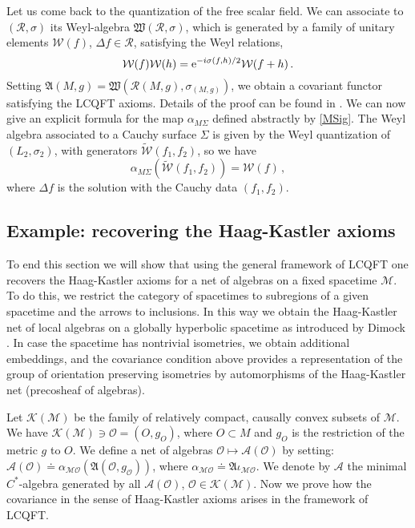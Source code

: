 \documentclass[12pt]{article}
\newcommand{\fA}{\mathfrak{A}}
\newcommand{\Kcal}{\mathcal{K}}
\newcommand{\Mcal}{\mathcal{M}}
\newcommand{\Ocal}{\mathcal{O}}
\newcommand{\Acal}{\mathcal{A}}
\newcommand{\Rcal}{\mathcal{R}}
\newcommand{\Wcal}{\mathcal{W}}
\newcommand{\al}{\alpha}
\newcommand{\De}{\Delta}
\newcommand{\1}{\mathds{1}}                         %
\newcommand{\be}{\begin{equation}}
\newcommand{\ee}{\end{equation}}
\begin{document}
{Let us come back to the quantization of the free scalar field. We can associate to $(\Rcal,\sigma)$ its Weyl-algebra $\mathfrak{W}({\mathcal R},\sigma)$, which is generated
by a family of unitary elements $\Wcal(f)$, $\De f \in {\mathcal R}$,
satisfying the Weyl relations,
\be\label{Weyl}
\Wcal(f)\Wcal(h) = {\rm
  e}^{-i\sigma(f,h)/2} \Wcal(f + h)\,.
  \ee
Setting
 $\fA(M,g) = \mathfrak{W}({\mathcal
  R}(M,g),\sigma_{(M,g)})$,
we obtain a covariant functor satisfying the LCQFT axioms. Details of the proof can be found in \cite{BFV}. We can now give an explicit formula for the map $\al_{M\Sigma}$ defined abstractly by \eqref{MSig}. The Weyl algebra associated to a Cauchy surface $\Sigma$ is given by the Weyl quantization of  $(L_2,\sigma_2)$, with generators $\widetilde{\Wcal}(f_1,f_2)$, so we have
\[
\al_{M\Sigma}(\widetilde{\Wcal}(f_1,f_2))=\Wcal(f)\,,
\]
where $\De f$ is the solution with the Cauchy data $(f_1,f_2)$.
\subsection{Example: recovering the Haag-Kastler axioms}
To end this section we will show that using the general framework of LCQFT one recovers the Haag-Kastler axioms for a net of algebras on a fixed spacetime $\Mcal$.
To do this, we restrict the category of spacetimes to subregions of a given spacetime and the arrows to inclusions. In this way we obtain the Haag-Kastler net of local algebras on a globally hyperbolic spacetime as introduced by Dimock \cite{Dim}. In case the spacetime has nontrivial  isometries,  we obtain additional embeddings, and the covariance condition above provides a representation of the group of orientation preserving isometries by automorphisms of the Haag-Kastler net (precosheaf of algebras). 

Let $\Kcal(\Mcal)$ be the family of relatively compact, causally convex subsets of $\Mcal$.  We have $\mathcal{K}(\mathcal{M})\ni\Ocal=(O,g_{O})$, where $O\subset M$ and $g_{O}$ is the restriction of the metric $g$ to $O$. 
 We define a net of algebras $\Ocal\mapsto \Acal(\Ocal)$ by setting: $\Acal(\Ocal)\doteq \al_{\Mcal\Ocal}(\fA(\Ocal,g_{\Ocal}))$, where $\al_{\Mcal\Ocal}\doteq \mathfrak{A}\iota_{\Mcal\mathcal{O}}$. We denote by $\Acal$ the minimal $C^*$-algebra generated by all $\Acal(\Ocal)$, $\Ocal\in\Kcal(\Mcal)$. Now we prove how the covariance in the sense of Haag-Kastler axioms arises in the framework of LCQFT. 
 
}
\end{document}
